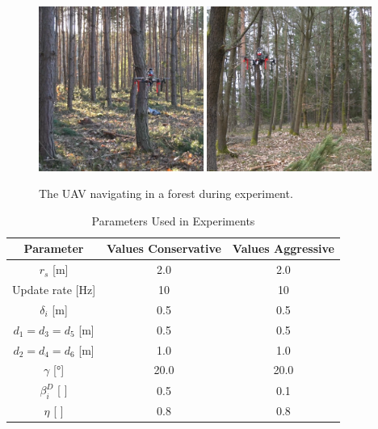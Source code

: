            \begin{figure}[htbp]
                \centering
                \includegraphics[width=0.48\textwidth]{./fig/photos/pic1.png}
                \includegraphics[width=0.48\textwidth]{./fig/photos/pic2.png}
                \caption{
                    The \ac{UAV} navigating in a forest during experiment. 
                }
                \label{fig:real_wrld_pics}
            \end{figure}

            \begin{table}[H]
                \centering
                \caption{Parameters Used in Experiments}
                \begin{tabular}{|c|c|c|}
                    \hline
                    Parameter & Values Conservative & Values Aggressive \\
                    \hline
                    $r_s$ [m] & 2.0 & 2.0 \\ \hline
                    Update rate [Hz] & 10 & 10 \\ \hline
                    $\delta_i$ [m] & 0.5 & 0.5  \\ \hline
                    $d_1 = d_3 = d_5$ [m] & 0.5 & 0.5  \\ \hline
                    $d_2 = d_4 = d_6$ [m] & 1.0 & 1.0 \\ \hline
                    $\gamma$ [°] & 20.0 & 20.0 \\ \hline
                    $\beta_i^D$ [ ] & 0.5 & 0.1 \\ \hline
                    $\eta$ [ ] & 0.8 & 0.8 \\ \hline
                \end{tabular}
                \label{tab:rbl_forest_conservative_flight}
            \end{table}

